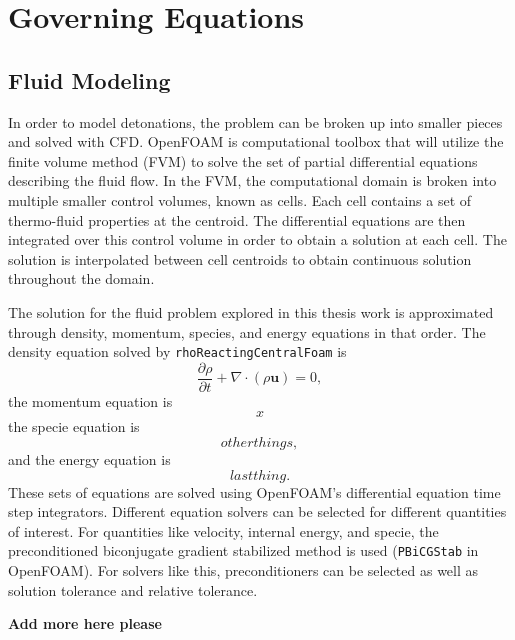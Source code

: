 \chapter{Governing Equations}
\label{math}

\section{Fluid Modeling}
In order to model detonations, the problem can be broken up into smaller pieces and solved with CFD. OpenFOAM is computational toolbox that will utilize the finite volume method (FVM) to solve the set of partial differential equations describing the fluid flow. In the FVM, the computational domain is broken into multiple smaller control volumes, known as cells. Each cell contains a set of thermo-fluid properties at the centroid. The differential equations are then integrated over this control volume in order to obtain a solution at each cell. The solution is interpolated between cell centroids to obtain continuous solution throughout the domain. 

The solution for the fluid problem explored in this thesis work is approximated through density, momentum, species, and energy equations in that order. The density equation solved by \verb|rhoReactingCentralFoam| is
\begin{equation}
\frac{\partial \rho}{\partial t} + \nabla \cdot \left(\rho \bm{u}\right) = 0,
\end{equation}
the momentum equation is
\begin{equation}
x
\end{equation}
the specie equation is
\[other things,\]
and the energy equation is
\[last thing.\]
These sets of equations are solved using OpenFOAM's differential equation time step integrators. Different equation solvers can be selected for different quantities of interest. For quantities like velocity, internal energy, and specie, the preconditioned biconjugate gradient stabilized method is used (\verb|PBiCGStab| in OpenFOAM). For solvers like this, preconditioners can be selected as well as solution tolerance and relative tolerance. 

\textbf{\color{red} Add more here please}


